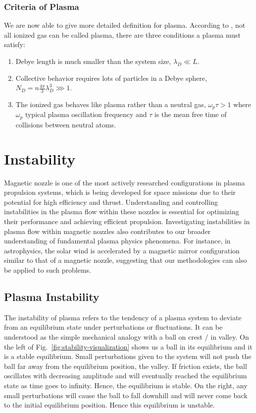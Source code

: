 \subsubsection*{Criteria of Plasma}
We are now able to give more detailed definition for plasma. According to \cite{chen_introduction_2016}, not all ionized gas can be called plasma, there are three conditions a plasma must satisfy:
\begin{enumerate}
	\item Debye length is much smaller than the system size, $\lambda_D \ll L$.
	\item Collective behavior requires lots of particles in a Debye sphere, $N_D = n\frac{4\pi}{3}\lambda_D^3 \ggg 1$.
	\item The ionized gas behaves like plasma rather than a neutral gas, $\omega_p\tau > 1$ where $\omega_p$ typical plasma oscillation frequency and $\tau$ is the mean free time of collisions between neutral atoms.
\end{enumerate}


\section{Instability} \label{sec:instability-of-plasma-flow}
Magnetic nozzle is one of the most actively researched configurations in plasma propulsion systems, which is being developed for space missions due to their potential for high efficiency and thrust. Understanding and controlling instabilities in the plasma flow within these nozzles is essential for optimizing their performance and achieving efficient propulsion. Investigating instabilities in plasma flow within magnetic nozzles also contributes to our broader understanding of fundamental plasma physics phenomena. For instance, in astrophysics, the solar wind is accelerated by a magnetic mirror configuration similar to that of a magnetic nozzle, suggesting that our methodologies can also be applied to such problems.

\subsection{Plasma Instability}
The instability of plasma refers to the tendency of a plasma system to deviate from an equilibrium state under perturbations or fluctuations. It can be understood as the simple mechanical analogy with a ball on crest / in valley. On the left of Fig.~\ref{fig:stability-visualization} shows us a ball in its equilibrium and it is a stable equilibrium. Small perturbations given to the system will not push the ball far away from the equilibrium position, the valley. If friction exists, the ball oscillates with decreasing amplitude and will eventually reached the equilibrium state as time goes to infinity. Hence, the equilibrium is stable. On the right, any small perturbations will cause the ball to fall downhill and will never come back to the initial equilibrium position. Hence this equilibrium is unstable.

